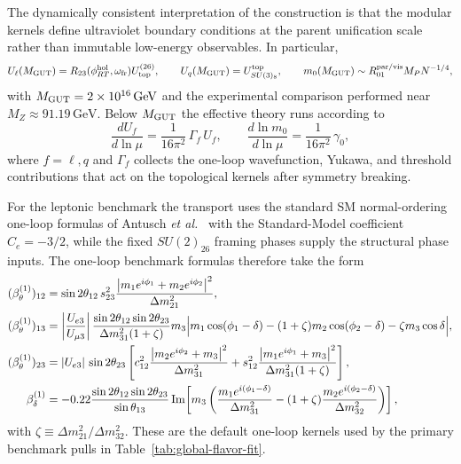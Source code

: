 \documentclass[11pt]{article}
\begin{document}
The dynamically consistent interpretation of the construction is that the modular kernels define ultraviolet boundary conditions at the parent unification scale rather than immutable low-energy observables. In particular,
\begin{equation}
 U_{\ell}(M_{\rm GUT}) = R_{23}(\phi_{RT}^{\rm hol},\omega_{\rm fr})U_{\rm top}^{(26)},
 \qquad
 U_q(M_{\rm GUT}) = U_{SU(3)_8}^{\rm top},
 \qquad
 m_0(M_{\rm GUT})\sim R_{01}^{\rm par/vis} M_PN^{-1/4},
\end{equation}
with $M_{\rm GUT}=2\times10^{16}\,\mathrm{GeV}$ and the experimental comparison performed near $M_Z\approx91.19\,\mathrm{GeV}$. Below $M_{\rm GUT}$ the effective theory runs according to
\begin{equation}
 \frac{dU_f}{d\ln\mu} = \frac{1}{16\pi^2}\,\Gamma_f\,U_f,
 \qquad
 \frac{d\ln m_0}{d\ln\mu} = \frac{1}{16\pi^2}\,\gamma_0,
\end{equation}
where $f=\ell,q$ and $\Gamma_f$ collects the one-loop wavefunction, Yukawa, and threshold contributions that act on the topological kernels after symmetry breaking.

For the leptonic benchmark the transport uses the standard SM normal-ordering one-loop formulas of Antusch \emph{et al.}~\cite{antusch2005} with the Standard-Model coefficient $C_e=-3/2$, while the fixed $SU(2)_{26}$ framing phases supply the structural phase inputs. The one-loop benchmark formulas therefore take the form
\begin{align}
 (\beta_{\theta}^{(1)})_{12}
 &=
 \sin2\theta_{12}\,s_{23}^2
 \frac{\left|m_1e^{i\phi_1}+m_2e^{i\phi_2}\right|^2}{\Delta m_{21}^2}, \\
 (\beta_{\theta}^{(1)})_{13}
 &=
 \left|\frac{U_{e3}}{U_{\mu3}}\right|
 \frac{\sin2\theta_{12}\sin2\theta_{23}}{\Delta m_{31}^2(1+\zeta)}
 m_3\Bigl|
 m_1\cos(\phi_1-\delta)
 -(1+\zeta)m_2\cos(\phi_2-\delta)
 -\zeta m_3\cos\delta
 \Bigr|, \\
 (\beta_{\theta}^{(1)})_{23}
 &=
 |U_{e3}|\,\sin2\theta_{23}
 \left[
 c_{12}^2\frac{\left|m_2e^{i\phi_2}+m_3\right|^2}{\Delta m_{31}^2}
 + s_{12}^2\frac{\left|m_1e^{i\phi_1}+m_3\right|^2}{\Delta m_{31}^2(1+\zeta)}
 \right], \\
 \beta_{\delta}^{(1)}
 &=
 -0.22
 \frac{\sin2\theta_{12}\sin2\theta_{23}}{\sin\theta_{13}}
 \Im\!\left[
 m_3\left(
 \frac{m_1e^{i(\phi_1-\delta)}}{\Delta m_{31}^2}
 -(1+\zeta)\frac{m_2e^{i(\phi_2-\delta)}}{\Delta m_{32}^2}
 \right)
 \right],
\end{align}
with $\zeta\equiv\Delta m_{21}^2/\Delta m_{32}^2$. These are the default one-loop kernels used by the primary benchmark pulls in Table~\ref{tab:global-flavor-fit}.
\end{document}
